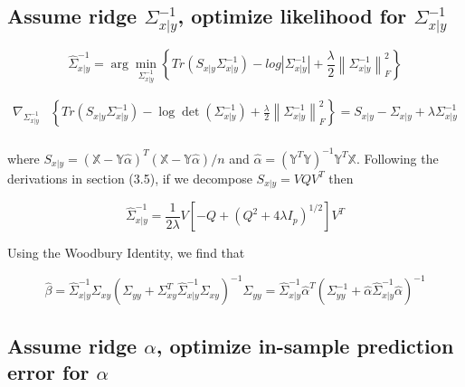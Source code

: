 \documentclass[11pt,]{book}
\theoremstyle{definition}
\theoremstyle{definition}
\theoremstyle{definition}
\theoremstyle{remark}
\begin{document}
\vspace{0.5cm}

\hypertarget{assume-ridge-sigma_x-y-1-optimize-likelihood-for-sigma_x-y-1}{%
\subsection{\texorpdfstring{Assume ridge \(\Sigma_{x | y}^{-1}\),
optimize likelihood for
\(\Sigma_{x | y}^{-1}\)}{Assume ridge \textbackslash{}Sigma\_\{x \textbar{} y\}\^{}\{-1\}, optimize likelihood for \textbackslash{}Sigma\_\{x \textbar{} y\}\^{}\{-1\}}}\label{assume-ridge-sigma_x-y-1-optimize-likelihood-for-sigma_x-y-1}}

\[ \hat{\Sigma}_{x | y}^{-1} = \arg\min_{\Sigma_{x | y}^{-1}}\left\{ Tr\left( S_{x | y}\Sigma_{x | y}^{-1} \right) - log\left| \Sigma_{x | y}^{-1} \right| + \frac{\lambda}{2}\left\| \Sigma_{x | y}^{-1} \right\|_{F}^{2} \right\} \]

\begin{align*}
  \nabla_{\Sigma_{x | y}^{-1}}&\left\{ Tr\left( S_{x | y}\Sigma_{x | y}^{-1} \right) - \log\det\left( \Sigma_{x | y}^{-1} \right) + \frac{\lambda}{2}\left\| \Sigma_{x | y}^{-1} \right\|_{F}^{2} \right\} = S_{x | y} - \Sigma_{x | y} + \lambda\Sigma_{x | y}^{-1} \\
\end{align*}

where
\(S_{x | y} = \left( \mathbb{X} - \mathbb{Y}\hat{\alpha} \right)^{T}\left( \mathbb{X} - \mathbb{Y}\hat{\alpha} \right)/n\)
and
\(\hat{\alpha} = \left( \mathbb{Y}^{T}\mathbb{Y} \right)^{-1}\mathbb{Y}^{T}\mathbb{X}\).
Following the derivations in section (3.5), if we decompose
\(S_{x | y} = VQV^{T}\) then

\[ \hat{\Sigma}_{x | y}^{-1} = \frac{1}{2\lambda}V\left[ -Q + \left( Q^{2} + 4\lambda I_{p} \right)^{1/2} \right]V^{T} \]

Using the Woodbury Identity, we find that

\[ \hat{\beta} = \hat{\Sigma}_{x | y}^{-1}\Sigma_{xy}\left( \Sigma_{yy} + \Sigma_{xy}^{T}\hat{\Sigma}_{x | y}^{-1}\Sigma_{xy} \right)^{-1}\Sigma_{yy} = \hat{\Sigma}_{x | y}^{-1}\hat{\alpha}^{T}\left( \Sigma_{yy}^{-1} + \hat{\alpha}\hat{\Sigma}_{x | y}^{-1}\hat{\alpha} \right)^{-1} \]

\vspace{0.5cm}

\hypertarget{assume-ridge-alpha-optimize-in-sample-prediction-error-for-alpha}{%
\subsection{\texorpdfstring{Assume ridge \(\alpha\), optimize in-sample
prediction error for
\(\alpha\)}{Assume ridge \textbackslash{}alpha, optimize in-sample prediction error for \textbackslash{}alpha}}\label{assume-ridge-alpha-optimize-in-sample-prediction-error-for-alpha}}
\end{document}
